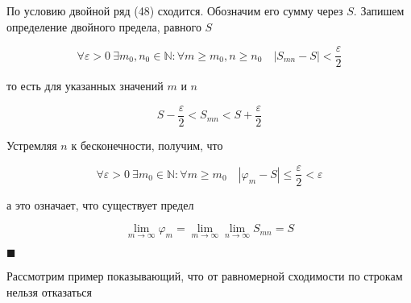 По условию двойной ряд (48) сходится. Обозначим его сумму через $S$. Запишем определение двойного предела, равного $S$

\begin{equation*}
	\forall \varepsilon > 0\ \exists m_0, n_0 \in \mathbb{N} \colon \forall m \geqslant m_0, n\geqslant n_0 \quad |S_{mn} - S| < \frac{\varepsilon}{2}
\end{equation*}

то есть для указанных значений $m$ и $n$

\begin{equation*}
	S - \frac{\varepsilon}{2} < S_{mn} < S + \frac{\varepsilon}{2}
\end{equation*}


Устремляя $n$ к бесконечности, получим, что
 
 \begin{equation*}
 	\forall \varepsilon > 0 \ \exists m_0 \in \mathbb{N} \colon \forall m \geqslant m_0 \quad |\varphi_m - S| \leqslant \frac{\varepsilon}{2} < \varepsilon
 \end{equation*}
 
 а это означает, что существует предел
 
 \begin{equation*}
 	\displaystyle\lim_{m \rightarrow \infty} \varphi_m = \displaystyle\lim_{m \rightarrow \infty} \displaystyle\lim_{n \rightarrow \infty} S_{mn} = S
 \end{equation*}
 
 \begin{flushright}
 	$\blacksquare$
 \end{flushright}
 
 \begin{note}
 	Рассмотрим пример показывающий, что от равномерной сходимости по строкам нельзя отказаться
 \end{note}
 
